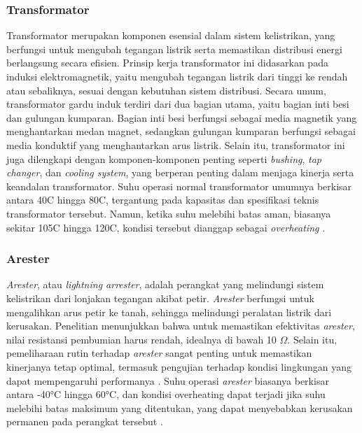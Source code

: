 \subsubsection{Transformator}
Transformator merupakan komponen esensial dalam sistem kelistrikan, yang berfungsi untuk mengubah tegangan listrik serta memastikan distribusi energi berlangsung secara efisien. Prinsip kerja transformator ini didasarkan pada induksi elektromagnetik, yaitu mengubah tegangan listrik dari tinggi ke rendah atau sebaliknya, sesuai dengan kebutuhan sistem distribusi. Secara umum, transformator gardu induk terdiri dari dua bagian utama, yaitu bagian inti besi dan gulungan kumparan. Bagian inti besi berfungsi sebagai media magnetik yang menghantarkan medan magnet, sedangkan gulungan kumparan berfungsi sebagai media konduktif yang menghantarkan arus listrik. Selain itu, transformator ini juga dilengkapi dengan komponen-komponen penting seperti \emph{bushing}, \emph{tap changer}, dan \emph{cooling system}, yang berperan penting dalam menjaga kinerja serta keandalan transformator. Suhu operasi normal transformator umumnya berkisar antara 40\textdegree{}C hingga 80\textdegree{}C, tergantung pada kapasitas dan spesifikasi teknis transformator tersebut. Namun, ketika suhu melebihi batas aman, biasanya sekitar 105\textdegree{}C hingga 120\textdegree{}C, kondisi tersebut dianggap sebagai \emph{overheating} \cite{tambunan2023kerja}.

\subsubsection{Arester}
\emph{Arester}, atau \emph{lightning arrester}, adalah perangkat yang melindungi sistem kelistrikan dari lonjakan tegangan akibat petir. \emph{Arester} berfungsi untuk mengalihkan arus petir ke tanah, sehingga melindungi peralatan listrik dari kerusakan. Penelitian menunjukkan bahwa untuk memastikan efektivitas \emph{arester}, nilai resistansi pembumian harus rendah, idealnya di bawah 10 $\Omega$. Selain itu, pemeliharaan rutin terhadap \emph{arester} sangat penting untuk memastikan kinerjanya tetap optimal, termasuk pengujian terhadap kondisi lingkungan yang dapat mempengaruhi performanya \cite{Suputra2024}. Suhu operasi \emph{arester} biasanya berkisar antara -40°C hingga 60°C, dan kondisi overheating dapat terjadi jika suhu melebihi batas maksimum yang ditentukan, yang dapat menyebabkan kerusakan permanen pada perangkat tersebut \cite{Kartika2022}.


